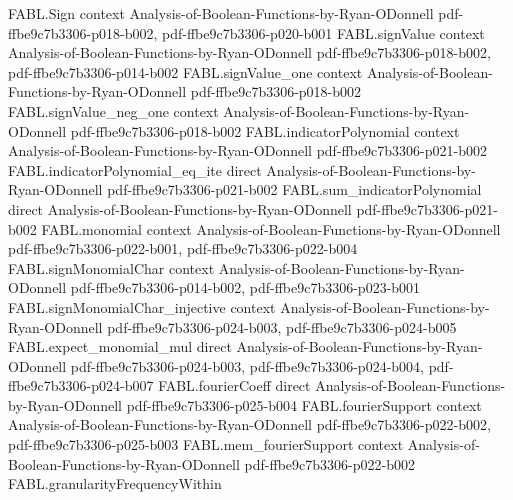 \begin{theorem}
\label{FABL.discreteDerivative_eq_fourier_sum}
\leanok
{}
\proofstep
  {FABL.Sign}
  {context}
  {Analysis-of-Boolean-Functions-by-Ryan-ODonnell}
  {pdf-ffbe9c7b3306-p018-b002,
    pdf-ffbe9c7b3306-p020-b001}
\proofstep
  {FABL.signValue}
  {context}
  {Analysis-of-Boolean-Functions-by-Ryan-ODonnell}
  {pdf-ffbe9c7b3306-p018-b002,
    pdf-ffbe9c7b3306-p014-b002}
\proofstep
  {FABL.signValue_one}
  {context}
  {Analysis-of-Boolean-Functions-by-Ryan-ODonnell}
  {pdf-ffbe9c7b3306-p018-b002}
\proofstep
  {FABL.signValue_neg_one}
  {context}
  {Analysis-of-Boolean-Functions-by-Ryan-ODonnell}
  {pdf-ffbe9c7b3306-p018-b002}
\proofstep
  {FABL.indicatorPolynomial}
  {context}
  {Analysis-of-Boolean-Functions-by-Ryan-ODonnell}
  {pdf-ffbe9c7b3306-p021-b002}
\proofstep
  {FABL.indicatorPolynomial_eq_ite}
  {direct}
  {Analysis-of-Boolean-Functions-by-Ryan-ODonnell}
  {pdf-ffbe9c7b3306-p021-b002}
\proofstep
  {FABL.sum_indicatorPolynomial}
  {direct}
  {Analysis-of-Boolean-Functions-by-Ryan-ODonnell}
  {pdf-ffbe9c7b3306-p021-b002}
\proofstep
  {FABL.monomial}
  {context}
  {Analysis-of-Boolean-Functions-by-Ryan-ODonnell}
  {pdf-ffbe9c7b3306-p022-b001,
    pdf-ffbe9c7b3306-p022-b004}
\proofstep
  {FABL.signMonomialChar}
  {context}
  {Analysis-of-Boolean-Functions-by-Ryan-ODonnell}
  {pdf-ffbe9c7b3306-p014-b002,
    pdf-ffbe9c7b3306-p023-b001}
\proofstep
  {FABL.signMonomialChar_injective}
  {context}
  {Analysis-of-Boolean-Functions-by-Ryan-ODonnell}
  {pdf-ffbe9c7b3306-p024-b003,
    pdf-ffbe9c7b3306-p024-b005}
\proofstep
  {FABL.expect_monomial_mul}
  {direct}
  {Analysis-of-Boolean-Functions-by-Ryan-ODonnell}
  {pdf-ffbe9c7b3306-p024-b003,
    pdf-ffbe9c7b3306-p024-b004,
    pdf-ffbe9c7b3306-p024-b007}
\proofstep
  {FABL.fourierCoeff}
  {direct}
  {Analysis-of-Boolean-Functions-by-Ryan-ODonnell}
  {pdf-ffbe9c7b3306-p025-b004}
\proofstep
  {FABL.fourierSupport}
  {context}
  {Analysis-of-Boolean-Functions-by-Ryan-ODonnell}
  {pdf-ffbe9c7b3306-p022-b002,
    pdf-ffbe9c7b3306-p025-b003}
\proofstep
  {FABL.mem_fourierSupport}
  {context}
  {Analysis-of-Boolean-Functions-by-Ryan-ODonnell}
  {pdf-ffbe9c7b3306-p022-b002}
\proofstep
  {FABL.granularityFrequencyWithin}

\end{theorem}
